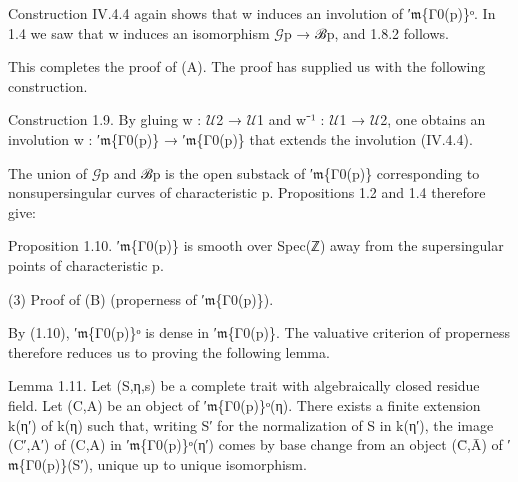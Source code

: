 \documentclass[11pt,a4paper]{article}
\begin{document}
Construction IV.4.4 again shows that w induces an involution of ′\ensuremath{\mathfrak{m}}\textunderscore{}\{Γ\textunderscore{}0(p)\}ᵒ. In 1.4 we saw that w induces an isomorphism \ensuremath{\mathcal{G}}\textunderscore{}p → ℬ\textunderscore{}p, and 1.8.2 follows.

This completes the proof of (A). The proof has supplied us with the following construction.

Construction 1.9. By gluing w : \ensuremath{\mathcal{U}}\textunderscore{}2 → \ensuremath{\mathcal{U}}\textunderscore{}1 and w⁻¹ : \ensuremath{\mathcal{U}}\textunderscore{}1 → \ensuremath{\mathcal{U}}\textunderscore{}2, one obtains an involution w : ′\ensuremath{\mathfrak{m}}\textunderscore{}\{Γ\textunderscore{}0(p)\} → ′\ensuremath{\mathfrak{m}}\textunderscore{}\{Γ\textunderscore{}0(p)\} that extends the involution (IV.4.4).

The union of \ensuremath{\mathcal{G}}\textunderscore{}p and ℬ\textunderscore{}p is the open substack of ′\ensuremath{\mathfrak{m}}\textunderscore{}\{Γ\textunderscore{}0(p)\} corresponding to nonsupersingular curves of characteristic p. Propositions 1.2 and 1.4 therefore give:

Proposition 1.10. ′\ensuremath{\mathfrak{m}}\textunderscore{}\{Γ\textunderscore{}0(p)\} is smooth over Spec(ℤ) away from the supersingular points of characteristic p.

(3) Proof of (B) (properness of ′\ensuremath{\mathfrak{m}}\textunderscore{}\{Γ\textunderscore{}0(p)\}).

By (1.10), ′\ensuremath{\mathfrak{m}}\textunderscore{}\{Γ\textunderscore{}0(p)\}ᵒ is dense in ′\ensuremath{\mathfrak{m}}\textunderscore{}\{Γ\textunderscore{}0(p)\}. The valuative criterion of properness therefore reduces us to proving the following lemma.

Lemma 1.11. Let (S,η,s) be a complete trait with algebraically closed residue field. Let (C,A) be an object of ′\ensuremath{\mathfrak{m}}\textunderscore{}\{Γ\textunderscore{}0(p)\}ᵒ(η). There exists a finite extension k(η′) of k(η) such that, writing S′ for the normalization of S in k(η′), the image (C′,A′) of (C,A) in ′\ensuremath{\mathfrak{m}}\textunderscore{}\{Γ\textunderscore{}0(p)\}ᵒ(η′) comes by base change from an object (C̄,Ā) of ′\ensuremath{\mathfrak{m}}\textunderscore{}\{Γ\textunderscore{}0(p)\}(S′), unique up to unique isomorphism.
\end{document}
